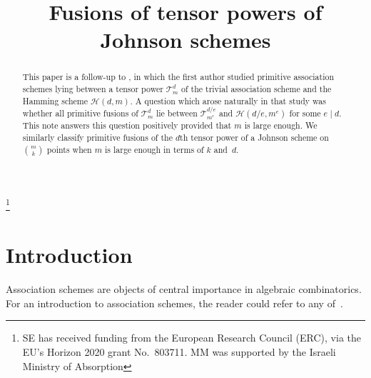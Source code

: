 \documentclass[ALCO]{cedram}
\newcommand{\cT}{{\mathcal T}}
\newcommand{\cH}{{\mathcal H}}
\newcommand{\cT}{{\mathcal T}}
\newcommand{\cH}{{\mathcal H}}
\begin{document}

\title{Fusions of tensor powers of Johnson schemes}

\author[\initial{S.} Eberhard]{ }
\address{Centre for Mathematical Sciences\\
    Wilberforce Road\\
    Cambridge CB3~0WB (U.K.)}

\author[\initial{M.} Muzychuk]{ }
\address{Department of Mathematics\\
Ben Gurion University\\
P.O.B. 653, Beer Sheva 8410501 (Israel)}

\thanks{SE has received funding from the European Research Council (ERC), via the EU's Horizon 2020 grant No.~803711. MM was supported by the Israeli Ministry of Absorption}



\begin{abstract}
This paper is a follow-up to \cite{E}, in which the first author
studied primitive association schemes lying between a tensor power $\cT_m^d$ of the trivial association scheme and the Hamming scheme $\cH(d,m)$.
A question which arose naturally in that study was whether all primitive fusions of $\cT_m^d$ lie between $\cT_{m^e}^{d/e}$ and $\cH(d/e, m^e)$ for some $e \mid d$.
This note answers this question positively provided that $m$ is large enough.
We similarly classify primitive fusions of the $d$th tensor power of a Johnson scheme on $\binom{m}{k}$ points when $m$ is large enough in terms of $k$ and~$d$.
\end{abstract}

\maketitle




\section{Introduction}

Association schemes are objects of central importance in algebraic combinatorics.
For an introduction to association schemes, the reader could refer to any of~\cite{CP,BI,Z,B,E}.
\end{document}
